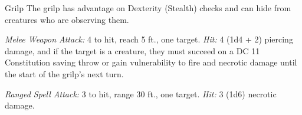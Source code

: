 \documentclass[10pt,a4paper,twoside,bg=print,twocolumn,openany,nodeprecatedcode]{dndbook}
\begin{document}
\begin{DndMonster}[float=t]{Grilp}
\DndMonsterBasics[
armor-class = {13 (natural armor)},
hit-points = {\DndDice{3d4 + 3}},
speed = {30 ft., fly 30 ft.}
]
\DndMonsterAbilityScores[
 str = 6,
 dex = 14,
 con = 12,
 int = 10,
 wis = 12,
 cha = 11
]
\DndMonsterDetails[
skills = {Stealth +6, Perception +3},
damage-immunities = {fire, necrotic},
senses = {darkvision 60 ft., passive perception 13},
languages = {Goblin, Infernal},
challenge = 1/4,
]
The grilp has advantage on Dexterity (Stealth) checks and can hide from creatures who are observing them.

\textsl{Melee Weapon Attack:} 4 to hit, reach 5 ft., one target. \textsl{Hit:} 4 (1d4 + 2) piercing damage, and if the target is a creature, they must succeed on a DC 11 Constitution saving throw or gain vulnerability to fire and necrotic damage until the start of the grilp's next turn.

\textsl{Ranged Spell Attack:} 3 to hit, range 30 ft., one target. \textsl{Hit:} 3 (1d6) necrotic damage.

\end{DndMonster}
\end{document}
